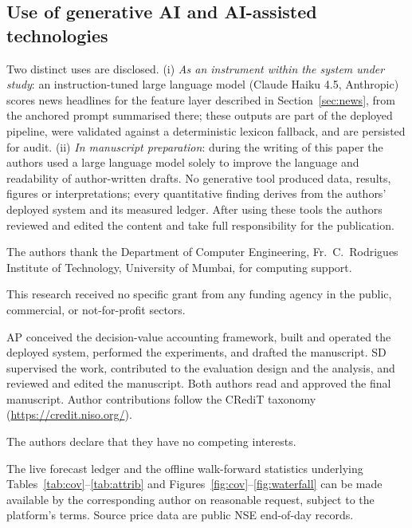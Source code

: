 \documentclass{sbc2023}%
\theoremstyle{definition}
\theoremstyle{plain}
\begin{document}
\subsection*{Use of generative AI and AI-assisted technologies}
Two distinct uses are disclosed. (i) \emph{As an instrument within the system under
study}: an instruction-tuned large language model (Claude Haiku 4.5, Anthropic) scores
news headlines for the feature layer described in Section~\ref{sec:news}, from the
anchored prompt summarised there; these outputs are part of the deployed pipeline,
were validated against a deterministic lexicon fallback, and are persisted for audit.
(ii) \emph{In manuscript preparation}: during the writing of this paper the authors
used a large language model solely to improve the language and readability of
author-written drafts. No generative tool produced data, results, figures or
interpretations; every quantitative finding derives from the authors' deployed system
and its measured ledger. After using these tools the authors reviewed and edited the
content and take full responsibility for the publication.

\begin{acknowledgements}
The authors thank the Department of Computer Engineering, Fr.\ C.\ Rodrigues Institute
of Technology, University of Mumbai, for computing support.
\end{acknowledgements}

\begin{funding}
This research received no specific grant from any funding agency in the public,
commercial, or not-for-profit sectors.
\end{funding}

\begin{contributions}
AP conceived the decision-value accounting framework, built and operated the deployed
system, performed the experiments, and drafted the manuscript. SD supervised the work,
contributed to the evaluation design and the analysis, and reviewed and edited the
manuscript. Both authors read and approved the final manuscript. Author contributions
follow the CRediT taxonomy (\url{https://credit.niso.org/}).
\end{contributions}

\begin{interests}
The authors declare that they have no competing interests.
\end{interests}

\begin{materials}
The live forecast ledger and the offline walk-forward statistics underlying
Tables~\ref{tab:cov}--\ref{tab:attrib} and Figures~\ref{fig:cov}--\ref{fig:waterfall}
can be made available by the corresponding author on reasonable request, subject to the
platform's terms. Source price data are public NSE end-of-day records.
\end{materials}



\end{document}

